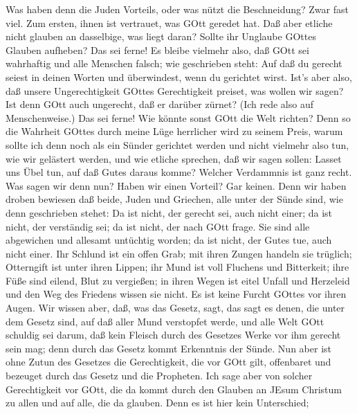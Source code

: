  Was haben denn die Juden Vorteils, oder was nützt die
Beschneidung?  Zwar fast viel. Zum ersten, ihnen ist
vertrauet, was GOtt geredet hat.  Daß aber etliche nicht
glauben an dasselbige, was liegt daran? Sollte ihr Unglaube GOttes
Glauben aufheben?  Das sei ferne! Es bleibe vielmehr also,
daß GOtt sei wahrhaftig und alle Menschen falsch; wie geschrieben steht:
Auf daß du gerecht seiest in deinen Worten und überwindest, wenn du
gerichtet wirst.  Ist's aber also, daß unsere
Ungerechtigkeit GOttes Gerechtigkeit preiset, was wollen wir sagen? Ist
denn GOtt auch ungerecht, daß er darüber zürnet? (Ich rede also auf
Menschenweise.)  Das sei ferne! Wie könnte sonst GOtt die
Welt richten?  Denn so die Wahrheit GOttes durch meine Lüge
herrlicher wird zu seinem Preis, warum sollte ich denn noch als ein
Sünder gerichtet werden  und nicht vielmehr also tun, wie
wir gelästert werden, und wie etliche sprechen, daß wir sagen sollen:
Lasset uns Übel tun, auf daß Gutes daraus komme? Welcher Verdammnis ist
ganz recht.  Was sagen wir denn nun? Haben wir einen
Vorteil? Gar keinen. Denn wir haben droben bewiesen daß beide, Juden und
Griechen, alle unter der Sünde sind,  wie denn geschrieben
stehet: Da ist nicht, der gerecht sei, auch nicht einer; 
da ist nicht, der verständig sei; da ist nicht, der nach GOtt frage.
 Sie sind alle abgewichen und allesamt untüchtig worden; da
ist nicht, der Gutes tue, auch nicht einer.  Ihr Schlund
ist ein offen Grab; mit ihren Zungen handeln sie trüglich; Otterngift
ist unter ihren Lippen;  ihr Mund ist voll Fluchens und
Bitterkeit;  ihre Füße sind eilend, Blut zu vergießen;
 in ihren Wegen ist eitel Unfall und Herzeleid
 und den Weg des Friedens wissen sie nicht. 
Es ist keine Furcht GOttes vor ihren Augen.  Wir wissen
aber, daß, was das Gesetz, sagt, das sagt es denen, die unter dem Gesetz
sind, auf daß aller Mund verstopfet werde, und alle Welt GOtt schuldig
sei  darum, daß kein Fleisch durch des Gesetzes Werke vor
ihm gerecht sein mag; denn durch das Gesetz kommt Erkenntnis der Sünde.
 Nun aber ist ohne Zutun des Gesetzes die Gerechtigkeit,
die vor GOtt gilt, offenbaret und bezeuget durch das Gesetz und die
Propheten.  Ich sage aber von solcher Gerechtigkeit vor
GOtt, die da kommt durch den Glauben an JEsum Christum zu allen und auf
alle, die da glauben.  Denn es ist hier kein Unterschied;
